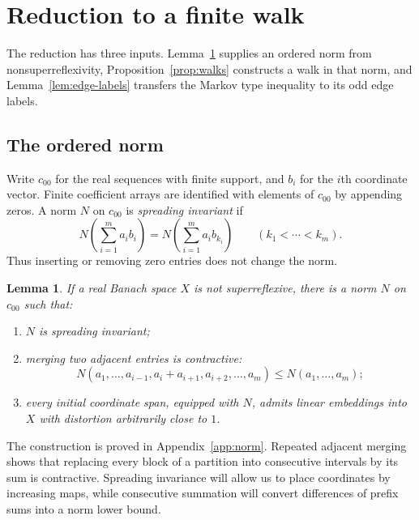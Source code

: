 \documentclass[11pt]{article}
\newtheorem{lemma}[theorem]{Lemma}
\theoremstyle{definition}
\theoremstyle{remark}
\begin{document}
\section{Reduction to a finite walk}\label{sec:reduction}

The reduction has three inputs. Lemma~\ref{lem:ordered-norm} supplies
an ordered norm from nonsuperreflexivity, Proposition~\ref{prop:walks}
constructs a walk in that norm, and Lemma~\ref{lem:edge-labels}
transfers the Markov type inequality to its odd edge labels.

\subsection{The ordered norm}

Write $c_{00}$ for the real sequences with finite support, and $b_i$ for
the $i$th coordinate vector. Finite coefficient arrays are identified with
elements of $c_{00}$ by appending zeros.
A norm $N$ on $c_{00}$ is \emph{spreading invariant} if
\begin{equation}\label{eq:spreading}
 N\left(\sum_{i=1}^m a_i b_i\right)
 =N\left(\sum_{i=1}^m a_i b_{k_i}\right)
 \qquad(k_1<\cdots<k_m).
\end{equation}
Thus inserting or removing zero entries does not change the norm.

\begin{lemma}\label{lem:ordered-norm}
If a real Banach space $X$ is not superreflexive, there is a norm $N$
on $c_{00}$ such that:
\begin{enumerate}[label=\textup{(\roman*)},leftmargin=*]
 \item $N$ is spreading invariant;
 \item merging two adjacent entries is contractive:
 \begin{equation}\label{eq:merge}
  N(a_1,\ldots,a_{i-1},a_i+a_{i+1},a_{i+2},\ldots,a_m)
  \leq N(a_1,\ldots,a_m);
 \end{equation}
 \item every initial coordinate span, equipped with $N$, admits
 linear embeddings into $X$ with distortion arbitrarily close to $1$.
\end{enumerate}
\end{lemma}

The construction is proved in Appendix~\ref{app:norm}.
Repeated adjacent merging shows that replacing every block of a partition
into consecutive intervals by its sum is contractive.
Spreading invariance will allow us to place coordinates by increasing
maps, while consecutive summation will convert differences of prefix
sums into a norm lower bound.
\end{document}
